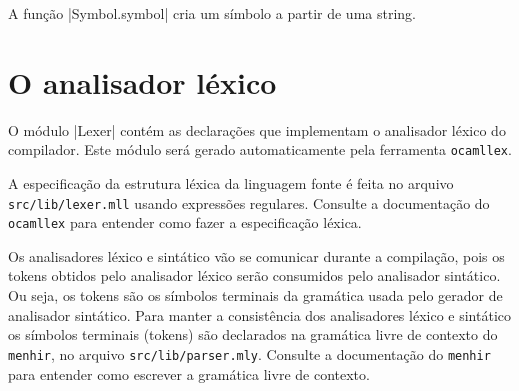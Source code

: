 \documentclass[a4paper,11pt,brazil]{article}
\begin{document}
A função \pyginline|Symbol.symbol| cria um símbolo a partir de uma
string.


\section{O  analisador léxico}

O módulo \pyginline|Lexer| contém as declarações que implementam o
analisador léxico do compilador. Este módulo será gerado
automaticamente pela ferramenta \texttt{ocamllex}.

A especificação da estrutura léxica da linguagem fonte é feita no
arquivo \texttt{src/lib/lexer.mll} usando expressões
regulares. Consulte a documentação do \texttt{ocamllex} para entender
como fazer a especificação léxica.

Os analisadores léxico e sintático vão se comunicar durante a
compilação, pois os tokens obtidos pelo analisador léxico serão
consumidos pelo analisador sintático. Ou seja, os tokens são os
símbolos terminais da gramática usada pelo gerador de analisador
sintático. Para manter a consistência dos analisadores léxico e
sintático os símbolos terminais (tokens) são declarados na gramática
livre de contexto do \texttt{menhir}, no arquivo
\texttt{src/lib/parser.mly}. Consulte a documentação do
\texttt{menhir} para entender como escrever a gramática livre de
contexto.
\end{document}
